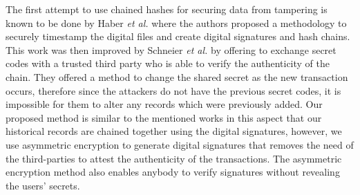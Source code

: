         The first attempt to use chained hashes for securing data from tampering
is known to be done by Haber {\it et al.} \cite{haber1991how} where the authors
proposed a methodology to securely timestamp the digital files and create
digital signatures and hash chains. This work was then improved by Schneier {\it
et al.} \cite{schneier1998cryptoraphic} \cite{schneier1999minimizing}
\cite{schneier1999secure} by offering to exchange secret codes with a trusted
third party who is able to verify the authenticity of the chain. They offered a
method to change the shared secret as the new transaction occurs, therefore
since the attackers do not have the previous secret codes, it is impossible for
them to alter any records which were previously added. Our proposed method is
similar to the mentioned works in this aspect that our historical records are
chained together using the digital signatures, however, we use asymmetric
encryption to generate digital signatures that removes the need of the
third-parties to attest the authenticity of the transactions. The asymmetric
encryption method also enables anybody to verify signatures without revealing
the users' secrets.
